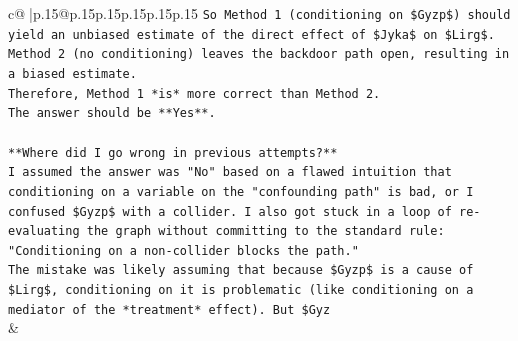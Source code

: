 \documentclass{article}
\begin{document}
{\begin{supertabular}{c@{$\;$}|p{.15\linewidth}@{}p{.15\linewidth}p{.15\linewidth}p{.15\linewidth}p{.15\linewidth}p{.15\linewidth}}
{{{\texttt{So Method 1 (conditioning on \$Gyzp\$) should yield an unbiased estimate of the direct effect of \$Jyka\$ on \$Lirg\$.} \\
\texttt{Method 2 (no conditioning) leaves the backdoor path open, resulting in a biased estimate.} \\
\texttt{Therefore, Method 1 *is* more correct than Method 2.} \\
\texttt{The answer should be **Yes**.} \\
\\ 
\texttt{**Where did I go wrong in previous attempts?**} \\
\texttt{I assumed the answer was "No" based on a flawed intuition that conditioning on a variable on the "confounding path" is bad, or I confused \$Gyzp\$ with a collider. I also got stuck in a loop of re{-}evaluating the graph without committing to the standard rule: "Conditioning on a non{-}collider blocks the path."} \\
\texttt{The mistake was likely assuming that because \$Gyzp\$ is a cause of \$Lirg\$, conditioning on it is problematic (like conditioning on a mediator of the *treatment* effect). But \$Gyz} \\
            }
        }
    }
    & \\ \\

\end{supertabular}
}
\end{document}
